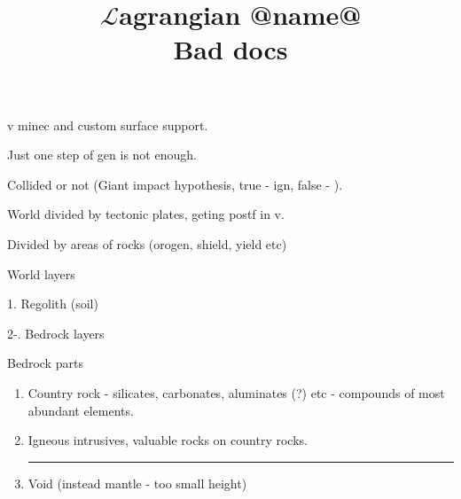 \documentclass[12pt]{article}
\title{$\mathcal{L}$agrangian @name@ \\ Bad docs}
\begin{document}
    \maketitle

    v minec and custom surface support.

    Just one step of gen is not enough.

    Collided or not (Giant impact hypothesis, true - ign, false - ).

    World divided by tectonic plates, geting postf in v.

    Divided by areas of rocks (orogen, shield, yield etc)

    World layers

    1. Regolith (soil)

    2-\infty. Bedrock layers

    Bedrock parts

    \begin{enumerate}
    \item Country rock - silicates, carbonates, aluminates (?) etc - compounds of most abundant elements.
    \item Igneous intrusives, valuable rocks on country rocks. \\
    \noindent\rule{\textwidth}{0.4pt}
    \item Void (instead mantle - too small height)
    \end{enumerate}
\end{document}
